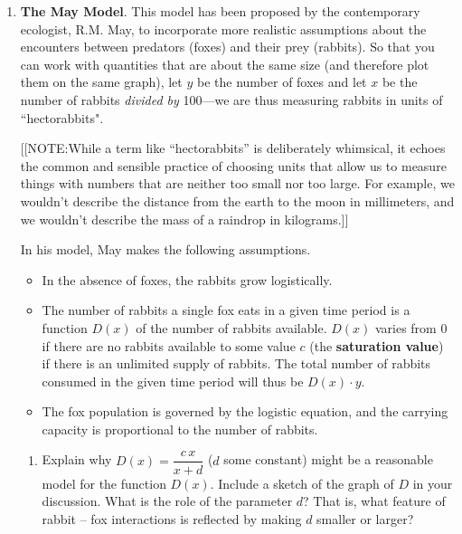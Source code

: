 \begin{enumerate}
\item {\bf The May Model}.\label{May model} This model has been
proposed by the contemporary ecologist, R.M. May, to
incorporate more realistic assumptions about the encounters between
predators (foxes) and their prey (rabbits).  So that you can work with
quantities that are about the same size (and therefore plot them on
the same graph), let $y$ be the number of foxes and let $x$ be the
number of rabbits {\em divided by\/} 100---we are thus measuring
rabbits in units of ``hectorabbits".

[[NOTE:While a term like ``hectorabbits'' is deliberately whimsical,
  it echoes the common and sensible practice of choosing units that
  allow us to measure things with numbers that are neither too small
  nor too large.  For example, we wouldn't describe the distance from
  the earth to the moon in millimeters, and we wouldn't describe the
  mass of a raindrop in kilograms.]]



In his model, May makes the following assumptions.
\begin{itemize}

\item In the absence of foxes, the rabbits grow logistically.

\item The number of rabbits a single fox eats in a given time period
  is a function $D(x)$ of the number of rabbits available.  $D(x)$
  varies from 0 if there are no rabbits available to some value $c$
  (the {\bf saturation value}) if there is an unlimited supply of
  rabbits.  The total number of rabbits consumed in the given time
  period will thus be $D(x)\cdot y$.

\item The fox population is governed by the logistic equation, and the
  carrying capacity is proportional to the number of rabbits.

 \end{itemize}


  \begin{enumerate}
  \item Explain why $D(x) =\dfrac{c\,x}{x+d}$ ($d$ some constant) might
be a reasonable model for the function $D(x)$.  Include a sketch of
the graph of $D$ in your discussion.  What is the role of the
parameter $d$?  That is, what feature of rabbit -- fox interactions is
reflected by making $d$ smaller or larger?


\end{enumerate}
\end{enumerate}
